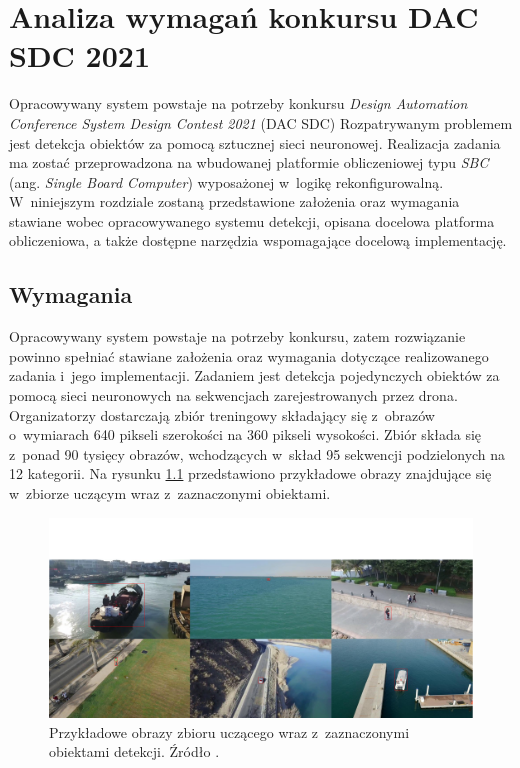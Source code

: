 \chapter{Analiza wymagań konkursu DAC SDC 2021}
\label{cha:Analiza probemu}

Opracowywany system powstaje na potrzeby konkursu \emph{Design Automation Conference System Design Contest 2021} (DAC SDC)
Rozpatrywanym problemem jest detekcja obiektów za pomocą sztucznej sieci neuronowej.
Realizacja zadania ma zostać przeprowadzona na wbudowanej platformie obliczeniowej typu \emph{SBC} (ang. \emph{Single Board Computer}) wyposażonej w~logikę rekonfigurowalną.
W~niniejszym rozdziale zostaną przedstawione założenia oraz wymagania stawiane wobec opracowywanego systemu detekcji, opisana docelowa platforma obliczeniowa, 
a także dostępne narzędzia wspomagające docelową implementację.


\section{Wymagania}
Opracowywany system powstaje na potrzeby konkursu, zatem rozwiązanie powinno spełniać stawiane założenia oraz wymagania dotyczące realizowanego zadania i~jego implementacji.
Zadaniem jest detekcja pojedynczych obiektów za pomocą sieci neuronowych na sekwencjach zarejestrowanych przez drona.
Organizatorzy dostarczają zbiór treningowy składający się z~obrazów o~wymiarach 640 pikseli szerokości na 360 pikseli wysokości. Zbiór składa się z~ponad 90 tysięcy obrazów, wchodzących w~skład 95 sekwencji podzielonych na 12 kategorii. Na rysunku \ref{fig:sample_images} przedstawiono przykładowe obrazy znajdujące się w~zbiorze uczącym wraz z~zaznaczonymi obiektami.
\begin{figure}
    \centering
    \includegraphics[width=\linewidth]{images/sample_images.png}
    \caption{Przykładowe obrazy zbioru uczącego wraz z~zaznaczonymi obiektami detekcji. Źródło \cite{dac_sdc_2021}.}
    \label{fig:sample_images}
\end{figure}


